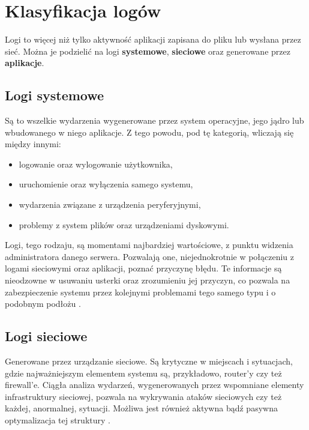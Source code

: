 \section{Klasyfikacja logów}
\label{chapter:logs:classification}

Logi to więcej niż tylko aktywność aplikacji zapisana do pliku lub wysłana przez sieć.
Można je podzielić na logi \textbf{systemowe}, \textbf{sieciowe} oraz generowane przez \textbf{aplikacje}.

    \subsection{Logi systemowe}
    \label{chapter:logs:classification:system}
    Są to wszelkie wydarzenia wygenerowane przez system operacyjne, jego jądro lub 
    wbudowanego w niego aplikacje. Z tego powodu, pod tę kategorią, wliczają się między innymi:
    \begin{itemize}
        \item logowanie oraz wylogowanie użytkownika,
        \item uruchomienie oraz wyłączenia samego systemu,
        \item wydarzenia związane z urządzenia peryferyjnymi,
        \item problemy z system plików oraz urządzeniami dyskowymi.
    \end{itemize}
    Logi, tego rodzaju, są momentami najbardziej wartościowe, z punktu widzenia administratora
    danego serwera. Pozwalają one, niejednokrotnie w połączeniu z logami sieciowymi oraz 
    aplikacji, poznać przyczynę błędu. Te informacje są nieodzowne w usuwaniu usterki
    oraz zrozumieniu jej przyczyn, co pozwala na zabezpieczenie systemu przez kolejnymi
    problemami tego samego typu i o podobnym podłożu \cite{logging_log_management}.
    
    \subsection{Logi sieciowe}
    \label{chapter:logs:classification:network}
    Generowane przez urządzanie sieciowe. Są krytyczne w miejscach i sytuacjach, gdzie 
    najważniejszym elementem systemu są, przykładowo, router'y czy też firewall'e. 
    Ciągła analiza wydarzeń, wygenerowanych przez wspomniane elementy infrastruktury sieciowej,
    pozwala na wykrywania ataków sieciowych czy też każdej, anormalnej, sytuacji. Możliwa 
    jest również aktywna bądź pasywna optymalizacja tej struktury \cite{logging_log_management}. 
    
